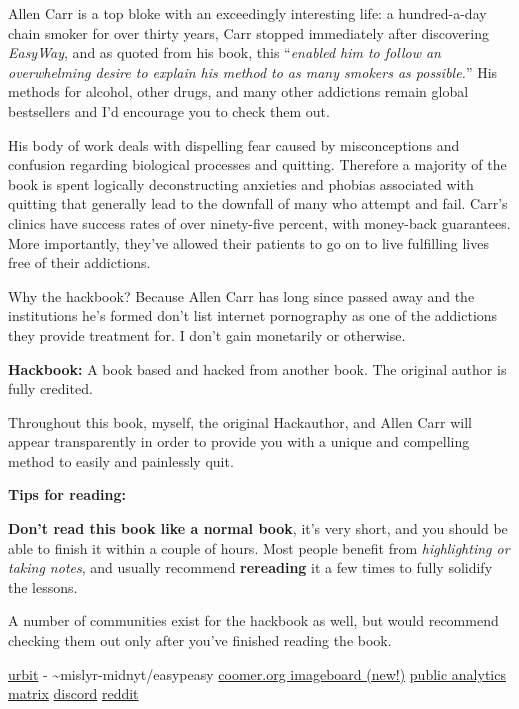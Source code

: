 \documentclass[
]{book}
\begin{document}
Allen Carr is a top bloke with an exceedingly interesting life: a hundred-a-day chain smoker for over thirty years, Carr stopped immediately after discovering \emph{EasyWay}, and as quoted from his book, this ``\emph{enabled him to follow an overwhelming desire to explain his method to as many smokers as possible.}'' His methods for alcohol, other drugs, and many other addictions remain global bestsellers and I'd encourage you to check them out.

His body of work deals with dispelling fear caused by misconceptions and confusion regarding biological processes and quitting. Therefore a majority of the book is spent logically deconstructing anxieties and phobias associated with quitting that generally lead to the downfall of many who attempt and fail. Carr's clinics have success rates of over ninety-five percent, with money-back guarantees. More importantly, they've allowed their patients to go on to live fulfilling lives free of their addictions.

Why the hackbook? Because Allen Carr has long since passed away and the institutions he's formed don't list internet pornography as one of the addictions they provide treatment for. I don't gain monetarily or otherwise.

{\textbf{Hackbook:} A book based and hacked from another book. The original author is fully credited. }

Throughout this book, myself, the original Hackauthor, and Allen Carr will appear transparently in order to provide you with a unique and compelling method to easily and painlessly quit.

{\textbf{Tips for reading:}}

\textbf{Don't read this book like a normal book}, it's very short, and you should be able to finish it within a couple of hours. Most people benefit from \emph{highlighting or taking notes}, and usually recommend \textbf{rereading} it a few times to fully solidify the lessons.

A number of communities exist for the hackbook as well, but would recommend checking them out only after you've finished reading the book.

\href{https://urbit.org}{urbit} - \textasciitilde mislyr-midnyt/easypeasy \textbar{} \href{https://coomer.org}{coomer.org imageboard (new!)} \textbar{} \href{https://plausible.io/easypeasymethod.org}{public analytics} \textbar{} \href{https://matrix.to/\#/!xmJZznbJXuwzEGSEti:matrix.org?via=matrix.org}{matrix} \textbar{} \href{https://discord.com/invite/bCXEnf9}{discord} \textbar{} \href{https://reddit.com/r/pmohackbook}{reddit}
\end{document}
